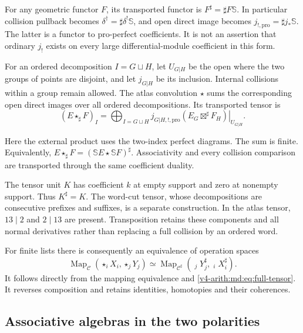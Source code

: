 For any geometric functor $F$, its transported functor is
$F^\sharp=\sharp F\mathbb S$. In particular collision
pullback becomes $\delta^\dagger=\sharp\delta^!\mathbb S$,
and open direct image becomes
$j_{!,\mathrm{pro}}=\sharp j_*\mathbb S$.
The latter is a functor to pro-perfect coefficients. It is
not an assertion that ordinary $j_!$ exists on every large
differential-module coefficient in this form.

For an ordered decomposition $I=G\sqcup H$, let $U_{G|H}$
be the open where the two groups of points are disjoint,
and let $j_{G|H}$ be its inclusion. Internal collisions
within a group remain allowed. The atlas convolution
$\star$ sums the corresponding open direct images over
all ordered decompositions. Its transported tensor is
\begin{equation}\label{v4-arith:md:eq:full-tensor}
 (E\star_\sharp F)_I
 =\bigoplus_{I=G\sqcup H}j_{G|H,!,\mathrm{pro}}
 \left.(E_G\boxtimes^\sharp F_H)\right|_{U_{G|H}}.
\end{equation}

Here the external product uses the two-index perfect
diagrams. The sum is finite. Equivalently,
$E\star_\sharp F=(\mathbb SE\star\mathbb SF)^\sharp$.
Associativity and every collision comparison are transported
through the same coefficient duality.

The tensor unit $K$ has coefficient $k$ at empty support
and zero at nonempty support. Thus $K^\sharp=K$.
The word-cut tensor, whose decompositions are consecutive
prefixes and suffixes, is a separate construction.
In the atlas tensor, $13\mid2$ and $2\mid13$ are present.
Transposition retains these components and all normal
derivatives rather than replacing a full collision by an
ordered word.

For finite lists there is consequently an equivalence of
operation spaces
\begin{equation}\label{v4-arith:md:eq:operation-spaces}
 \operatorname{Map}_{\mathcal C}
       \left(\mathop{\star}_iX_i,\mathop{\star}_jY_j\right)
 \simeq
 \operatorname{Map}_{\mathcal C^\sharp}
       \left(\mathop{\star_\sharp}_jY_j^\sharp,
                         \mathop{\star_\sharp}_iX_i^\sharp\right).
\end{equation}
It follows directly from the mapping equivalence and
\eqref{v4-arith:md:eq:full-tensor}. It reverses composition
and retains identities, homotopies and their coherences.

\subsection{Associative algebras in the two polarities}

